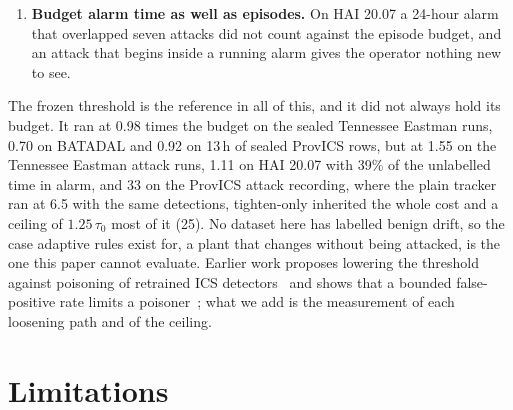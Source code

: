 \documentclass[sigconf]{acmart}
\begin{document}
\begin{enumerate}
  when drift raises false alarms~\cite{cretu2008sanitizing}. Our only evidence is negative: a gate
  that approved loosening whenever the alarm log was quiet let the silent campaign through, and an
  oracle that blocked loosening only during labelled events caught 1 of 10 terminal steps; recalibration
  that trusts a quiet alarm log was poisoned by pulses too short to count, and recalibration on days an
  oracle knows to be clean was not (Section~\ref{sec:practice}). We tested no human operator.
\item \textbf{Budget alarm time as well as episodes.} On HAI 20.07 a 24-hour alarm that overlapped
  seven attacks did not count against the episode budget, and an attack that begins inside a running
  alarm gives the operator nothing new to see.
\end{enumerate}

The frozen threshold is the reference in all of this, and it did not always hold its budget. It ran at
0.98 times the budget on the sealed Tennessee Eastman runs, 0.70 on BATADAL and 0.92 on 13\,h of sealed
ProvICS rows, but at 1.55 on the Tennessee Eastman attack runs, 1.11 on HAI 20.07 with 39\% of the
unlabelled time in alarm, and 33 on the ProvICS attack recording, where the plain tracker ran at 6.5
with the same detections, tighten-only inherited the whole cost and a ceiling of $1.25\,\tau_0$ most of
it (25). No dataset here has labelled benign drift, so the case adaptive rules exist for, a plant that
changes without being attacked, is the one this paper cannot evaluate. Earlier work proposes lowering
the threshold against poisoning of retrained ICS detectors~\cite{kravchik2021poisoning} and shows that
a bounded false-positive rate limits a poisoner~\cite{kloft2012security}; what we add is the
measurement of each loosening path and of the ceiling.

\section{Limitations}
\label{sec:limitations}
\end{document}
